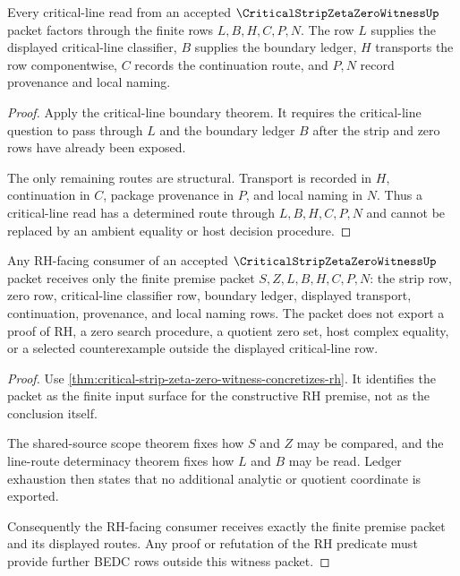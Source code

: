\begin{theorem}
\label{thm:critical-strip-zeta-zero-line-route-determinacy}
Every critical-line read from an accepted $\CriticalStripZetaZeroWitnessUp$ packet factors through the finite rows $L,B,H,C,P,N$. The row $L$ supplies the displayed critical-line classifier, $B$ supplies the boundary ledger, $H$ transports the row componentwise, $C$ records the continuation route, and $P,N$ record provenance and local naming.
\end{theorem}
\begin{proof}
Apply the critical-line boundary theorem. It requires the critical-line question to pass through $L$ and the boundary ledger $B$ after the strip and zero rows have already been exposed.

The only remaining routes are structural. Transport is recorded in $H$, continuation in $C$, package provenance in $P$, and local naming in $N$. Thus a critical-line read has a determined route through $L,B,H,C,P,N$ and cannot be replaced by an ambient equality or host decision procedure.
\end{proof}

\begin{theorem}
\label{thm:critical-strip-zeta-zero-rh-input-ledger}
Any RH-facing consumer of an accepted $\CriticalStripZetaZeroWitnessUp$ packet receives only the finite premise packet $S,Z,L,B,H,C,P,N$: the strip row, zero row, critical-line classifier row, boundary ledger, displayed transport, continuation, provenance, and local naming rows. The packet does not export a proof of RH, a zero search procedure, a quotient zero set, host complex equality, or a selected counterexample outside the displayed critical-line row.
\end{theorem}
\begin{proof}
Use \autoref{thm:critical-strip-zeta-zero-witness-concretizes-rh}. It identifies the packet as the finite input surface for the constructive RH premise, not as the conclusion itself.

The shared-source scope theorem fixes how $S$ and $Z$ may be compared, and the line-route determinacy theorem fixes how $L$ and $B$ may be read. Ledger exhaustion then states that no additional analytic or quotient coordinate is exported.

Consequently the RH-facing consumer receives exactly the finite premise packet and its displayed routes. Any proof or refutation of the RH predicate must provide further BEDC rows outside this witness packet.
\end{proof}

